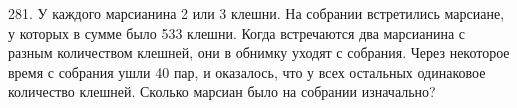 281. У каждого марсианина 2 или 3 клешни. На собрании встретились марсиане, у которых в сумме было 533 клешни. Когда встречаются два марсианина с разным количеством клешней, они в обнимку уходят с собрания. Через некоторое время с собрания ушли 40 пар, и оказалось, что у всех остальных одинаковое количество клешней. Сколько марсиан было на собрании изначально?\\
